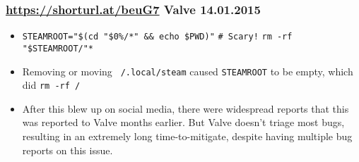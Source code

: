 \documentclass[handout]{beamer}
\begin{document}
 \begin{frame}
	 \frametitle{
		 \href{https://shorturl.at/beuG7}{https://shorturl.at/beuG7}
		 Valve
		 14.01.2015
	 }
	 \begin{itemize}
		 \item \texttt{STEAMROOT="\$(cd "\${0\%/*}" \&\& echo \$PWD)"} \newline
		 	\texttt{\# Scary!} \newline
		 	\texttt{rm -rf "\$STEAMROOT/"*} \pause
		 \item Removing or moving \texttt{~/.local/steam} caused \texttt{STEAMROOT} to be empty,
			 which did \texttt{rm -rf /} \pause
		 \item After this blew up on social media, there were widespread reports that this was reported to Valve months earlier. But Valve doesn't triage most bugs, resulting in an extremely long time-to-mitigate, despite having multiple bug reports on this issue.
	 \end{itemize}
 \end{frame}
\end{document}
